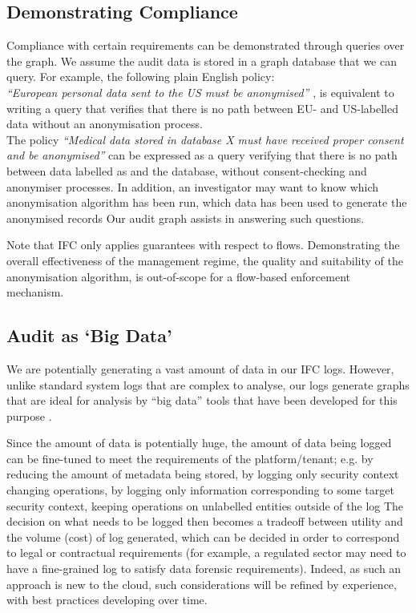 \documentclass[10pt,journal,compsoc]{IEEEtran}
\begin{document}
\subsection{Demonstrating Compliance}


Compliance with certain requirements  can be demonstrated through queries over the graph.
We assume the audit data is stored in a graph database that we can query.
For example, the following plain English policy:\\
\emph{``European personal data sent to the US must be anonymised''}
\cite{pasquier2014.claw}, is equivalent to writing a query that verifies that there is no path between EU- and US-labelled data without an anonymisation process. \\
The policy \emph{``Medical data stored in database X must have received proper consent and be anonymised''} \cite{singh2015:claw-magazine} 
can be expressed as a query verifying that there is no path between data labelled as  and the database, without consent-checking and anonymiser processes. In addition, an investigator may want to know which anonymisation algorithm has been run, which data has been used to generate the anonymised records \etc 
Our audit graph assists in answering such questions.

Note that IFC only applies guarantees with respect to flows. Demonstrating the overall effectiveness of the management regime, \eg the quality and suitability of the anonymisation algorithm, is out-of-scope for a flow-based enforcement mechanism.




\subsection{Audit as `Big Data'}

We are potentially generating a vast amount of data in our IFC logs. 
However, unlike standard system logs that are complex to analyse, our logs generate graphs that are ideal for analysis by ``big data'' tools that have been developed for this purpose \cite{angles2008survey}.

Since the amount of data is potentially huge, the amount of data being logged can be fine-tuned to meet the requirements of the platform/tenant; e.g. 
by reducing the amount of metadata being stored, by logging only security context changing operations, by logging only information corresponding to some target security context, keeping operations on unlabelled entities outside of the log \etc
The decision on what needs to be logged then becomes a tradeoff between utility and the volume (cost) of log generated, which can be decided in order to correspond to legal or contractual requirements (for example, a regulated sector may need to have a fine-grained log to satisfy data forensic requirements). Indeed, as such an approach is new to the cloud, such considerations will be refined by experience, with best practices developing over time.
\end{document}
